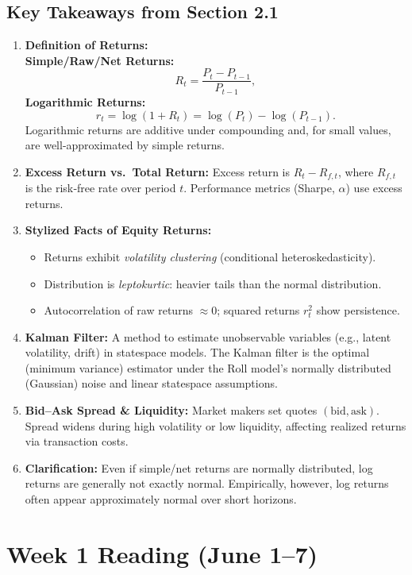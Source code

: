 \documentclass[11pt]{amsart}
\begin{document}
\subsection{Key Takeaways from Section 2.1}
\begin{enumerate}[noitemsep,left=0pt]
	\item \textbf{Definition of Returns:} \\
	      \textbf{Simple/Raw/Net Returns:}
	      \[
		      R_t = \frac{P_t - P_{t-1}}{P_{t-1}},
	      \]
	      \textbf{Logarithmic Returns:}
	      \[
		      r_t = \log(1 + R_t) = \log(P_t) - \log(P_{t-1}).
	      \]
	      Logarithmic returns are additive under compounding and, for small values, are well-approximated by simple returns.
	\item \textbf{Excess Return vs.\ Total Return:}
	      Excess return is $R_t - R_{f,t}$, where $R_{f,t}$ is the risk‐free rate over period $t$. Performance metrics (Sharpe, $\alpha$) use excess returns.
	\item \textbf{Stylized Facts of Equity Returns:}
	      \begin{itemize}[noitemsep,left=2em]
		      \item Returns exhibit \emph{volatility clustering} (conditional heteroskedasticity).
		      \item Distribution is \emph{leptokurtic}: heavier tails than the normal distribution.
		      \item Autocorrelation of raw returns $\approx 0$; squared returns $r_t^2$ show persistence.
	      \end{itemize}
	\item \textbf{Kalman Filter:}
	      A method to estimate unobservable variables (e.g., latent volatility, drift) in state\textendash space models. The Kalman filter is the optimal (minimum variance) estimator under the Roll model's normally distributed (Gaussian) noise and linear state\textendash space assumptions.
	\item \textbf{Bid–Ask Spread \& Liquidity:}
	      Market makers set quotes $(\text{bid}, \text{ask})$. Spread widens during high volatility or low liquidity, affecting realized returns via transaction costs.
	\item \textbf{Clarification:} Even if simple/net returns are normally distributed, log returns are generally not exactly normal. Empirically, however, log returns often appear approximately normal over short horizons.
\end{enumerate}

\section{Week 1 Reading (June 1–7)}
\end{document}
